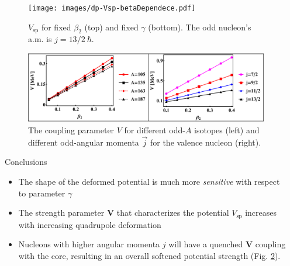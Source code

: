 \documentclass[final]{beamer}
\newlength{\sepwidth}
\newlength{\colwidth}
\newcommand{\separatorcolumn}{\begin{column}{\sepwidth}\end{column}}
\begin{document}
\begin{frame}[t]
\begin{columns}[t]
\begin{column}{\colwidth}
\begin{figure}
     \texttt{[image: images/dp-Vsp-betaDependece.pdf]}
     \caption{$V_\text{sp}$ for fixed $\beta_2$ (top) and fixed $\gamma$ (bottom). The odd nucleon's a.m. is $j=13/2\ \hbar$.}
     \label{gamma-beta-dev-v}
 \end{figure}
 \begin{figure}
     \centering
     \includegraphics[scale=1.4]{images/V_param.pdf}
     \caption{The coupling parameter $V$ for different odd-$A$ isotopes (left) and different odd-angular momenta $\vec{j}$ for the valence nucleon (right).}
     \label{v-param}
 \end{figure}
    \begin{block}{Conclusions}
    \begin{itemize}
    \item The shape of the deformed potential is much more \emph{sensitive} with respect to  parameter $\gamma$
    \item The strength parameter $\mathbf{V}$ that characterizes the potential $V_\text{sp}$ increases with increasing quadrupole deformation
    \item Nucleons with higher angular momenta $j$ will have a quenched $\mathbf{V}$ coupling with the core, resulting in an overall softened potential strength (Fig. \ref{v-param}).
    \end{itemize}
  \end{block}


\end{column}

\separatorcolumn

\end{columns}

\end{frame}
\end{document}
